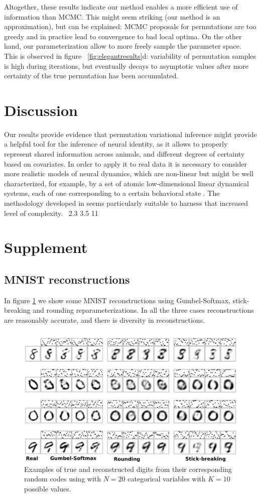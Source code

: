 \documentclass[twoside]{article}
\begin{document}
Altogether, these results indicate our method enables a more efficient use of information than MCMC. This might seem striking (our method is an approximation), but can be explained: MCMC proposals for permutations are too greedy and in practice lead to convergence to bad local optima. On the other hand, our parameterization allow to more freely sample the parameter space. This is observed in figure  ~\ref{fig:elegantresults}d: variability of permutation samples is high during iterations, but eventually decays to asymptotic values after more certainty of the true permutation has been accumulated.
\section{Discussion}
Our results provide evidence that permutation variational inference might provide a helpful tool for the inference of neural identity, as it allows to properly represent shared information across animals, and different degrees of certainty based on covariates. In order to apply it to real data it is necessary to consider more realistic models of neural dynamics, which are non-linear but might be well characterized, for example, by a set of atomic low-dimensional linear dynamical systems, each of one corresponding to a certain behavioral state  \cite{Kato2015}. The methodology developed in \cite{Linderman2016} seems particularly suitable to harness that increased level of complexity. \
2.3 3.5 11


\pagebreak 
\appendix
\section*{Supplement}
\subsection*{MNIST reconstructions}
In figure \ref{fig:VAE} we show some MNIST  reconstructions using Gumbel-Softmax, stick-breaking and rounding reparameterizations. In all the three cases reconstructions are reasonably accurate, and there is diversity in reconstructions.
\begin{figure}[t]
  \centering
  \includegraphics[width=5.in]{../figures/figure4.pdf} 
  \caption{Examples of true and reconstructed digits from their corresponding random codes using with $N=20$ categorical variables with $K=10$ possible values.
  }
\label{fig:VAE}
\end{figure}
\end{document}
